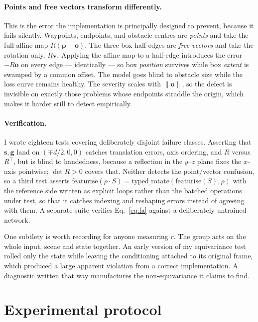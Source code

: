 \documentclass[11pt,a4paper]{article}
\newcommand{\svec}{\mathbf{s}}
\newcommand{\gvec}{\mathbf{g}}
\begin{document}
\paragraph{Points and free vectors transform differently.} This is the error the
implementation is principally designed to prevent, because it fails silently.
Waypoints, endpoints, and obstacle centres are \emph{points} and take the full
affine map $R(\mathbf{p} - \mathbf{o})$. The three box half-edges are \emph{free
vectors} and take the rotation only, $R\mathbf{v}$. Applying the affine map to a
half-edge introduces the error $-R\mathbf{o}$ on every edge --- identically --- so
box \emph{position} survives while box \emph{extent} is swamped by a common
offset. The model goes blind to obstacle size while the loss curve remains
healthy. The severity scales with $\|\mathbf{o}\|$, so the defect is invisible on
exactly those problems whose endpoints straddle the origin, which makes it harder
still to detect empirically.

\paragraph{Verification.} I wrote eighteen tests covering deliberately disjoint
failure classes. Asserting that $\svec, \gvec$ land on $(\mp d/2, 0, 0)$ catches
translation errors, axis ordering, and $R$ versus $R^\top$, but is blind to
handedness, because a reflection in the $y$--$z$ plane fixes the $x$-axis
pointwise; $\det R > 0$ covers that. Neither detects the point/vector confusion,
so a third test asserts
$\mathrm{featurise}(\rho \cdot S) = \mathrm{typed\_rotate}(\mathrm{featurise}(S), \rho)$
with the reference side written as explicit loops rather than the batched
operations under test, so that it catches indexing and reshaping errors instead
of agreeing with them. A separate suite verifies Eq.~\eqref{eq:fa} against a
deliberately untrained network.

One subtlety is worth recording for anyone measuring $r$. The group acts on the
whole input, scene and state together. An early version of my equivariance test
rolled only the state while leaving the conditioning attached to its original
frame, which produced a large apparent violation from a correct implementation. A
diagnostic written that way manufactures the non-equivariance it claims to find.

\section{Experimental protocol}
\label{sec:protocol}
\end{document}
